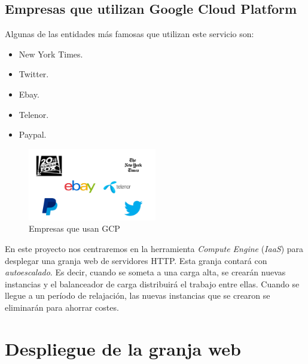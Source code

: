 \documentclass[12pt,spanish]{article}
\begin{document}
\subsection{Empresas que utilizan Google Cloud Platform}

Algunas de las entidades más famosas que utilizan este servicio son:
\begin{itemize}
 \item New York Times.
 \item Twitter.
 \item Ebay.
 \item Telenor.
 \item Paypal.
\end{itemize}

\begin{figure}[H]
	\centering
	\includegraphics[width=0.5\textwidth]{project/logos.png}
	\caption{Empresas que usan GCP}
\end{figure}

En este proyecto nos centraremos en la herramienta \emph{Compute Engine} (\emph{IaaS}) para desplegar una granja web de servidores HTTP. Esta granja contará con \emph{autoescalado}. Es decir, cuando se someta a una carga alta, se crearán nuevas instancias y el balanceador de carga distribuirá el trabajo entre ellas. Cuando se llegue a un período de relajación, las nuevas instancias que se crearon se eliminarán para ahorrar costes.

\newpage
\section{Despliegue de la granja web}
\end{document}
